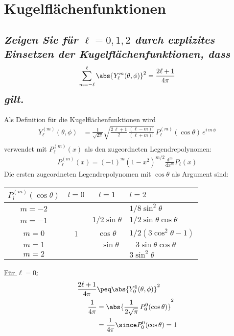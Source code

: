 \documentclass[ex,minted]{exercise_4.0}
\begin{document}
\section{Kugelflächenfunktionen}
\subsection{\it Zeigen Sie für \(\ell=0,1,2\) durch explizites Einsetzen der Kugelflächenfunktionen, dass
\begin{align*}
    \sum_{m=-\ell}^\ell \abs{Y_\ell^m(\theta, \phi)}^2 = \frac{2\ell+1}{4\pi}
\end{align*}
gilt.
}

\dottedlinett

Als Definition für die Kugelflächenfunktionen wird 
\begin{align*}  
    Y_\ell^{(m)}(\theta, \phi) &= \frac{1}{\sqrt{2\pi}}\sqrt{\frac{2\,\ell + 1}{2} \, \frac{(\ell - m)!}{(\ell + m)!}} \, P_\ell^{(m)}(\cos \theta) \, e^{i\,m\,\phi}\\
\end{align*}
verwendet mit \(P_\ell^{(m)}(x)\) als den zugeordneten Legendrepolynomen:
\begin{align*}
    P_\ell^{(m)}(x) = (-1)^m \left(1-x^2\right)^{m/2} \frac{\mathrm{d}^m}{\mathrm{d}x^m} P_\ell(x)
\end{align*}
Die ersten zugeordneten Legendrepolynomen mit \(\cos\theta\) als Argument sind:

\begin{center}
    \begin{tabularx}{.5\textwidth}{|c|c|c|y|}
        \hline
        \(P_l^{(m)}(\cos\theta)\)& \(l=0\)& \(l=1\)& \(l=2\)\\\hline
        $m=-2$ & & & $1/8\sin^2\theta$ \\\hline
        $m=-1$ & & $1/2\sin\theta$ & $1/2\sin\theta\cos\theta$ \\\hline
        $m=0$ & 1& $\cos\theta$ & $1/2 (3\cos^2\theta-1)$\\\hline
        $m=1$ & & $-\sin\theta$ & $-3\sin\theta\cos\theta$ \\\hline
        $m=2$ & & & $3\sin^2\theta$\\\hline
    \end{tabularx}
\end{center}

\underline{Für $\ell=0$:}
\begin{align*}
    \frac{2\ell+1}{4\pi} &\peq \abs{Y_0^0(\theta, \phi)}^2\\
    \frac{1}{4\pi}&=\abs{ \frac{1}{2\sqrt{\pi}} \, P_0^{0}(\cos \theta)}^2\\
    &= \frac{1}{4\pi} \since P_0^0(\cos\theta) = 1\\
\end{align*}
\end{document}

